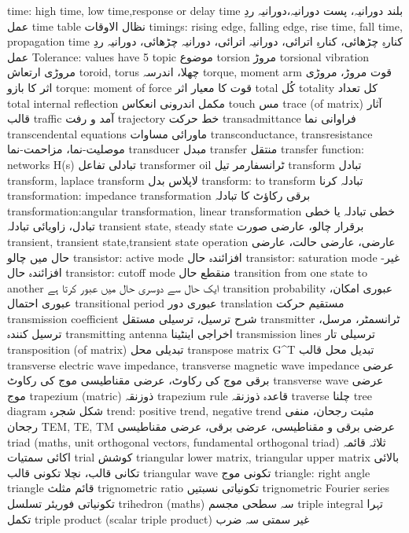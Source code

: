 time: high time, low time,response or delay time	بلند دورانیہ، پست دورانیہ،دورانیہ ردِ عمل 
time table	نظال الاوقات
timings: rising edge, falling edge, rise time, fall time, propagation time	کنارہِ چڑھائی، کنارہِ اترائی، دورانیہ اترائی، دورانیہ چڑھائی، دورانیہ ردِ عمل
Tolerance: values have 5%
topic	موضوع
torsion	مروڑ
torsional vibration	مروڑی ارتعاش
toroid, torus	چھلا، اندرسہ
torque, moment arm	قوت مروڑ، مروڑی اثر کا بازو
torque: moment of force	قوت کا معیار اثر
total	کُل
totality	کل تعداد
total internal reflection	مکمل اندرونی انعکاس
touch	مس
trace (of matrix)	آثار قالب
traffic	آمد و رفت
trajectory	خط حرکت
transadmittance	فراوانی نما
transcendental equations	ماورائی مساوات
transconductance, transresistance	موصلیت-نما، مزاحمت-نما
transducer	مبدل
transfer	منتقل
transfer function: networks H(s)	تبادلی تفاعل
transformer oil	ٹرانسفارمر تیل
transform	تبادل
transform, laplace transform	لاپلاس بدل
transform: to transform	تبادلہ کرنا
transformation: impedance transformation	برقی رکاؤٹ کا تبادلہ
transformation:angular transformation, linear transformation	خطی تبادلہ یا خطی تبادل، زاویائی تبادلہ
transient state, steady state	برقرار چالو، عارضی صورت
transient, transient state,transient state operation	عارضی، عارضی حالت، عارضی حال میں چالو
transistor: active mode	افزائندہ حال
transistor: saturation mode	غیر-افزائندہ حال
transistor: cutoff mode	منقطع حال
transition from one state to another	ایک حال سے دوسری حال میں عبور کرتا ہے
transition probability	عبوری امکان، عبوری احتمال
transitional period	عبوری دور
translation	مستقیم حرکت
transmission coefficient	شرح ترسیل، ترسیلی مستقل
transmitter	ٹرانسمٹر، مرسل، ترسیل کنندہ
transmitting antenna	اخراجی اینٹینا
transmission lines	ترسیلی تار
transposition (of matrix)	تبدیلی محل
transpose matrix G^T	تبدیل محل قالب
transverse electric wave impedance, transverse magnetic wave impedance	عرضی برقی موج کی رکاوٹ، عرضی مقناطیسی موج کی رکاوٹ
transverse wave	عرضی موج
trapezium (matric)	ذوزنقہ
trapezium rule	قاعدہ ذوزنقہ
traverse	چلنا
tree diagram	شکل شجرہ
trend: positive trend, negative trend	مثبت رجحان، منفی رجحان
TEM, TE, TM	عرضی برقی و مقناطیسی، عرضی برقی، عرضی مقناطیسی
triad (maths, unit orthogonal vectors, fundamental orthogonal triad)	ثلاثہ قائمہ اکائی سمتیات
trial	کوشش
triangular lower matrix, triangular upper matrix	بالائی تکانی قالب، نچلا تکونی قالب
triangular wave	تکونی موج
triangle: right angle triangle	قائم مثلث
trignometric ratio	تکونیاتی نسبتیں
trignometric Fourier series	تکونیاتی  فوریئر تسلسل
trihedron (maths)	سہ سطحی مجسم
triple integral	تہرا تکمل
triple product (scalar triple product)	غیر سمتی سہ ضرب
